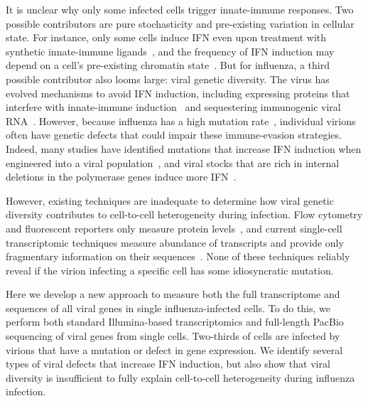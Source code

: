 \documentclass[lineno]{asm-article}
\begin{document}
It is unclear why only some infected cells trigger innate-immune responses.
Two possible contributors are pure stochasticity and pre-existing variation in cellular state.
For instance, only some cells induce IFN even upon treatment with synthetic innate-immune ligands~\cite{shalek2013single, shalek2014single, wimmers2018single}, and the frequency of IFN induction may depend on a cell's pre-existing chromatin state~\cite{bhushal2017cell}.
But for influenza, a third possible contributor also looms large: viral genetic diversity.
The virus has evolved mechanisms to avoid IFN induction, including expressing proteins that interfere with innate-immune induction~\cite{garcia1998influenza, hale2008multifunctional,hayashi2015influenza,vreede2010mechanisms,dudek2011influenza} and sequestering immunogenic viral RNA~\cite{killip2015influenza}.
However, because influenza has a high mutation rate~\cite{parvin1986measurement, suarez1992heterogeneity, suarez1994estimation, bloom2014experimentally, pauly2017novel}, individual virions often have genetic defects that could impair these immune-evasion strategies.
Indeed, many studies have identified mutations that increase IFN induction when engineered into a viral population~\cite{killip2017single, velthuis2018mini, du2018genome, perez2014unbiased}, and viral stocks that are rich in internal deletions in the polymerase genes induce more IFN~\cite{wang2018cell, baum2010preference, tapia2013defective, boergeling2015evidence, dimmock2015cloned, liu2019inhibition}.

However, existing techniques are inadequate to determine how viral genetic diversity contributes to cell-to-cell heterogeneity during infection.
Flow cytometry and fluorescent reporters only measure protein levels~\cite{sjaastad2018distinct, brooke2013most, guo2017single}, and current single-cell transcriptomic techniques measure abundance of transcripts and provide only fragmentary information on their sequences~\cite{russell2018extreme, steuerman2018dissection, wang2018cell, zanini2018single, zanini2018virus, saikia2018simultaneous, oneal2018west}.
None of these techniques reliably reveal if the virion infecting a specific cell has some idiosyncratic mutation.

Here we develop a new approach to measure both the full transcriptome and sequences of all viral genes in single influenza-infected cells.
To do this, we perform both standard Illumina-based transcriptomics and full-length PacBio sequencing of viral genes from single cells.
Two-thirds of cells are infected by virions that have a mutation or defect in gene expression.
We identify several types of viral defects that increase IFN induction, but also show that viral diversity is insufficient to fully explain cell-to-cell heterogeneity during influenza infection.
\end{document}
